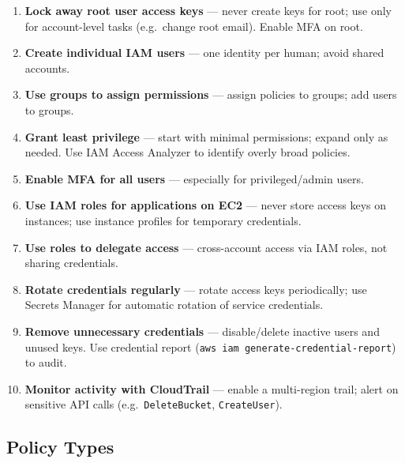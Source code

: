 \begin{enumerate}
  \item \textbf{Lock away root user access keys} --- never create keys for root; use only for
        account-level tasks (e.g.\ change root email). Enable MFA on root.
  \item \textbf{Create individual IAM users} --- one identity per human; avoid shared accounts.
  \item \textbf{Use groups to assign permissions} --- assign policies to groups; add users to groups.
  \item \textbf{Grant least privilege} --- start with minimal permissions; expand only as needed.
        Use IAM Access Analyzer to identify overly broad policies.
  \item \textbf{Enable MFA for all users} --- especially for privileged/admin users.
  \item \textbf{Use IAM roles for applications on EC2} --- never store access keys on instances;
        use instance profiles for temporary credentials.
  \item \textbf{Use roles to delegate access} --- cross-account access via IAM roles, not
        sharing credentials.
  \item \textbf{Rotate credentials regularly} --- rotate access keys periodically;
        use Secrets Manager for automatic rotation of service credentials.
  \item \textbf{Remove unnecessary credentials} --- disable/delete inactive users and unused keys.
        Use credential report (\texttt{aws iam generate-credential-report}) to audit.
  \item \textbf{Monitor activity with CloudTrail} --- enable a multi-region trail; alert on
        sensitive API calls (e.g.\ \texttt{DeleteBucket}, \texttt{CreateUser}).
\end{enumerate}

\subsection{Policy Types}

